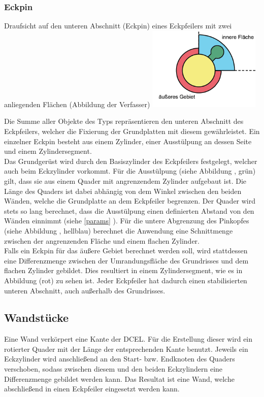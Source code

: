 \subsubsection{Eckpin}
\label{Eckpin}

\begin{Bild}{Draufsicht auf den unteren Abschnitt (Eckpin) eines Eckpfeilers mit zwei anliegenden Flächen (Abbildung der Verfasser)}
	\includegraphics[height=150px]{Bilder/CornerPin2D-07.png}
\end{Bild}

Die Summe aller Objekte des Typs  repräsentieren den unteren Abschnitt des Eckpfeilers, welcher die Fixierung der Grundplatten mit diesem gewährleistet.
Ein einzelner Eckpin besteht aus einem Zylinder, einer Ausstülpung an dessen Seite und einem Zylindersegment. \\
Das Grundgerüst wird durch den Basiszylinder des Eckpfeilers festgelegt, welcher auch beim Eckzylinder vorkommt.
Für die Ausstülpung (siehe Abbildung \thebildnr, grün) gilt, dass sie aus einem Quader mit angrenzendem Zylinder aufgebaut ist.
Die Länge des Quaders ist dabei abhängig von dem Winkel zwischen den beiden Wänden, welche die Grundplatte an dem Eckpfeiler begrenzen.
Der Quader wird stets so lang berechnet, dass die Ausstülpung einen definierten Abstand von den Wänden einnimmt (siehe \ref{params} ).
Für die untere Abgrenzung des Pinkopfes (siehe Abbildung \thebildnr, hellblau) berechnet die Anwendung eine Schnittmenge zwischen der angrenzenden Fläche und einem flachen Zylinder.\\
Falls ein Eckpin für das äußere Gebiet berechnet werden soll, wird stattdessen eine Differenzmenge zwischen der Umrandungsfläche des Grundrisses und dem flachen Zylinder gebildet.
Dies resultiert in einem Zylindersegment, wie es in Abbildung \thebildnr (rot) zu sehen ist.
Jeder Eckpfeiler hat dadurch einen stabilisierten unteren Abschnitt, auch außerhalb des Grundrisses.

\subsection{Wandstücke}
Eine Wand verkörpert eine Kante der DCEL.
Für die Erstellung dieser wird ein rotierter Quader mit der Länge der entsprechenden Kante benutzt.
Jeweils ein Eckzylinder wird anschließend an den Start- bzw. Endknoten des Quaders verschoben, sodass zwischen diesem und den beiden Eckzylindern eine Differenzmenge gebildet werden kann.
Das Resultat ist eine Wand, welche abschließend in einen Eckpfeiler eingesetzt werden kann. 

